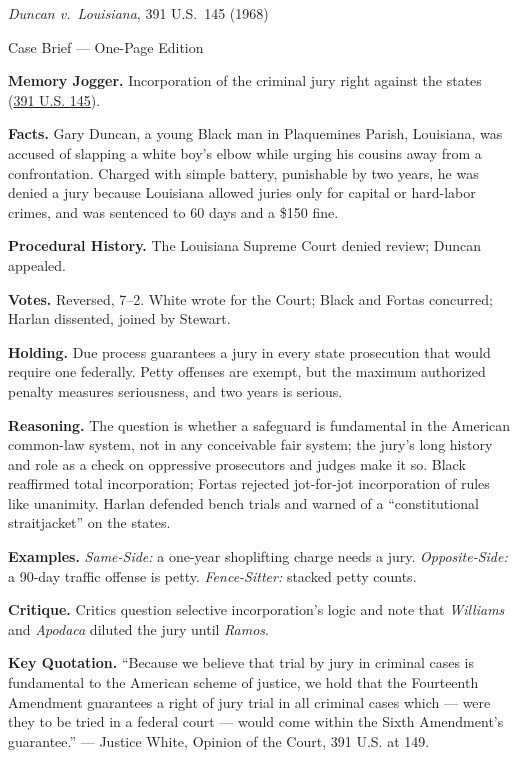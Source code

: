 \documentclass[12pt]{article}
\begin{document}
\begin{center}
{\Large \textit{Duncan v.\ Louisiana}, 391 U.S.\ 145 (1968)\par}
\vspace{0.3em}
{\normalsize Case Brief --- One-Page Edition\par}
\end{center}

\textbf{Memory Jogger.} Incorporation of the criminal jury right against the states (\href{https://supreme.justia.com/cases/federal/us/391/145/}{391 U.S. 145}).

\textbf{Facts.} Gary Duncan, a young Black man in Plaquemines Parish, Louisiana, was accused of slapping a white boy's elbow while urging his cousins away from a confrontation. Charged with simple battery, punishable by two years, he was denied a jury because Louisiana allowed juries only for capital or hard-labor crimes, and was sentenced to 60 days and a \$150 fine.

\textbf{Procedural History.} The Louisiana Supreme Court denied review; Duncan appealed.

\textbf{Votes.} Reversed, 7--2. White wrote for the Court; Black and Fortas concurred; Harlan dissented, joined by Stewart.

\textbf{Holding.} Due process guarantees a jury in every state prosecution that would require one federally. Petty offenses are exempt, but the maximum authorized penalty measures seriousness, and two years is serious.

\textbf{Reasoning.} The question is whether a safeguard is fundamental in the American common-law system, not in any conceivable fair system; the jury's long history and role as a check on oppressive prosecutors and judges make it so. Black reaffirmed total incorporation; Fortas rejected jot-for-jot incorporation of rules like unanimity. Harlan defended bench trials and warned of a ``constitutional straitjacket'' on the states.

\textbf{Examples.} \emph{Same-Side:} a one-year shoplifting charge needs a jury. \emph{Opposite-Side:} a 90-day traffic offense is petty. \emph{Fence-Sitter:} stacked petty counts.

\textbf{Critique.} Critics question selective incorporation's logic and note that \textit{Williams} and \textit{Apodaca} diluted the jury until \textit{Ramos}.

\textbf{Key Quotation.} ``Because we believe that trial by jury in criminal cases is fundamental to the American scheme of justice, we hold that the Fourteenth Amendment guarantees a right of jury trial in all criminal cases which --- were they to be tried in a federal court --- would come within the Sixth Amendment's guarantee.'' --- Justice White, Opinion of the Court, 391 U.S. at 149.
\end{document}
